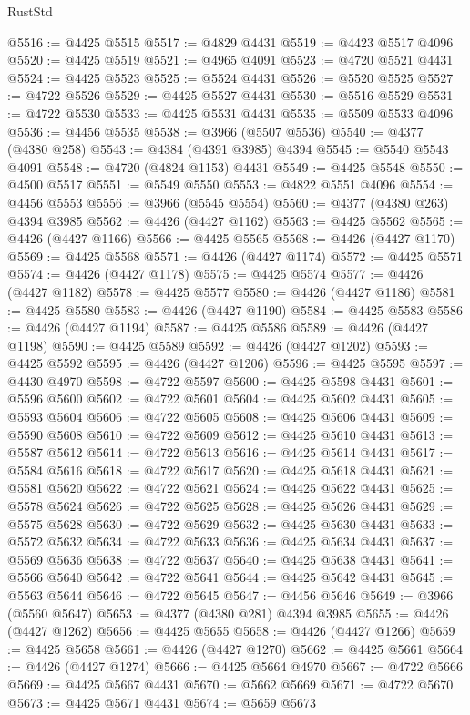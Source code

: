 \begin{lexlean}{RustStd}
\begin{coremodule}
@5516 := @4425 @5515
@5517 := @4829 @4431
@5519 := @4423 @5517 @4096
@5520 := @4425 @5519
@5521 := @4965 @4091
@5523 := @4720 @5521 @4431
@5524 := @4425 @5523
@5525 := @5524 @4431
@5526 := @5520 @5525
@5527 := @4722 @5526
@5529 := @4425 @5527 @4431
@5530 := @5516 @5529
@5531 := @4722 @5530
@5533 := @4425 @5531 @4431
@5535 := @5509 @5533 @4096
@5536 := @4456 @5535
@5538 := @3966 (@5507 @5536)
@5540 := @4377 (@4380 @258)
@5543 := @4384 (@4391 @3985) @4394
@5545 := @5540 @5543 @4091
@5548 := @4720 (@4824 @1153) @4431
@5549 := @4425 @5548
@5550 := @4500 @5517
@5551 := @5549 @5550
@5553 := @4822 @5551 @4096
@5554 := @4456 @5553
@5556 := @3966 (@5545 @5554)
@5560 := @4377 (@4380 @263) @4394 @3985
@5562 := @4426 (@4427 @1162)
@5563 := @4425 @5562
@5565 := @4426 (@4427 @1166)
@5566 := @4425 @5565
@5568 := @4426 (@4427 @1170)
@5569 := @4425 @5568
@5571 := @4426 (@4427 @1174)
@5572 := @4425 @5571
@5574 := @4426 (@4427 @1178)
@5575 := @4425 @5574
@5577 := @4426 (@4427 @1182)
@5578 := @4425 @5577
@5580 := @4426 (@4427 @1186)
@5581 := @4425 @5580
@5583 := @4426 (@4427 @1190)
@5584 := @4425 @5583
@5586 := @4426 (@4427 @1194)
@5587 := @4425 @5586
@5589 := @4426 (@4427 @1198)
@5590 := @4425 @5589
@5592 := @4426 (@4427 @1202)
@5593 := @4425 @5592
@5595 := @4426 (@4427 @1206)
@5596 := @4425 @5595
@5597 := @4430 @4970
@5598 := @4722 @5597
@5600 := @4425 @5598 @4431
@5601 := @5596 @5600
@5602 := @4722 @5601
@5604 := @4425 @5602 @4431
@5605 := @5593 @5604
@5606 := @4722 @5605
@5608 := @4425 @5606 @4431
@5609 := @5590 @5608
@5610 := @4722 @5609
@5612 := @4425 @5610 @4431
@5613 := @5587 @5612
@5614 := @4722 @5613
@5616 := @4425 @5614 @4431
@5617 := @5584 @5616
@5618 := @4722 @5617
@5620 := @4425 @5618 @4431
@5621 := @5581 @5620
@5622 := @4722 @5621
@5624 := @4425 @5622 @4431
@5625 := @5578 @5624
@5626 := @4722 @5625
@5628 := @4425 @5626 @4431
@5629 := @5575 @5628
@5630 := @4722 @5629
@5632 := @4425 @5630 @4431
@5633 := @5572 @5632
@5634 := @4722 @5633
@5636 := @4425 @5634 @4431
@5637 := @5569 @5636
@5638 := @4722 @5637
@5640 := @4425 @5638 @4431
@5641 := @5566 @5640
@5642 := @4722 @5641
@5644 := @4425 @5642 @4431
@5645 := @5563 @5644
@5646 := @4722 @5645
@5647 := @4456 @5646
@5649 := @3966 (@5560 @5647)
@5653 := @4377 (@4380 @281) @4394 @3985
@5655 := @4426 (@4427 @1262)
@5656 := @4425 @5655
@5658 := @4426 (@4427 @1266)
@5659 := @4425 @5658
@5661 := @4426 (@4427 @1270)
@5662 := @4425 @5661
@5664 := @4426 (@4427 @1274)
@5666 := @4425 @5664 @4970
@5667 := @4722 @5666
@5669 := @4425 @5667 @4431
@5670 := @5662 @5669
@5671 := @4722 @5670
@5673 := @4425 @5671 @4431
@5674 := @5659 @5673

\end{coremodule}
\end{lexlean}
